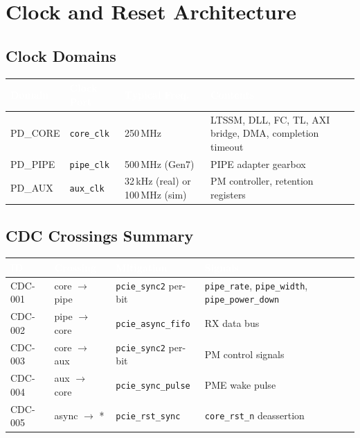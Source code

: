 \documentclass[11pt,a4paper]{article}
\newcommand{\theadcell}[1]{%
  \cellcolor{tablehead}\textcolor{white}{\textbf{#1}}}
\begin{document}
\section{Clock and Reset Architecture}

\subsection{Clock Domains}

\begin{tabular}{p{2.5cm}p{3cm}p{3cm}p{5cm}}
  \toprule
  \theadcell{Domain} & \theadcell{Clock Port} & \theadcell{Typical Freq.} & \theadcell{Contents} \\
  \midrule
  PD\_CORE & \texttt{core\_clk} & 250\,MHz & LTSSM, DLL, FC, TL, AXI bridge, DMA, completion timeout \\
  PD\_PIPE & \texttt{pipe\_clk} & 500\,MHz (Gen7) & PIPE adapter gearbox \\
  PD\_AUX  & \texttt{aux\_clk}  & 32\,kHz (real) or 100\,MHz (sim) & PM controller, retention registers \\
  \bottomrule
\end{tabular}

\subsection{CDC Crossings Summary}

\begin{tabular}{p{1.5cm}p{3cm}p{3cm}p{6cm}}
  \toprule
  \theadcell{ID} & \theadcell{Crossing} & \theadcell{Mitigation} & \theadcell{Signals} \\
  \midrule
  CDC-001 & core $\to$ pipe  & \texttt{pcie\_sync2} per-bit & \texttt{pipe\_rate}, \texttt{pipe\_width}, \texttt{pipe\_power\_down} \\
  CDC-002 & pipe $\to$ core  & \texttt{pcie\_async\_fifo} & RX data bus \\
  CDC-003 & core $\to$ aux   & \texttt{pcie\_sync2} per-bit & PM control signals \\
  CDC-004 & aux $\to$ core   & \texttt{pcie\_sync\_pulse}   & PME wake pulse \\
  CDC-005 & async $\to$ *    & \texttt{pcie\_rst\_sync}    & \texttt{core\_rst\_n} deassertion \\
  \bottomrule
\end{tabular}
\end{document}
